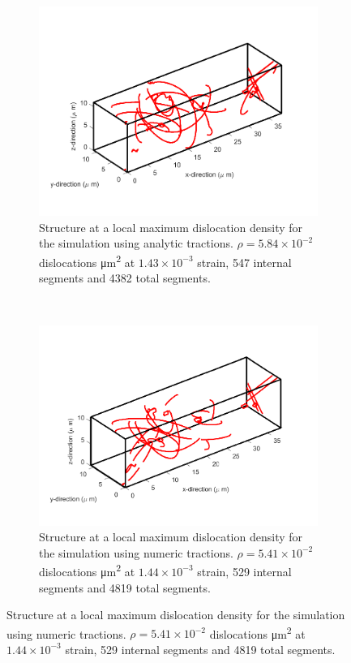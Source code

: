 \begin{figure}
    \centering
    \begin{subfigure}[t]{0.45\linewidth}
        \centering
        \includegraphics[width=\linewidth]{../data/maxDens_nSeg_547_nSegTot_4382_11-Mar-2021_8_tensile_ni_100.pdf}
        \caption[Structure at a local maximum dislocation density for the simulation using analytic tractions.]{Structure at a local maximum dislocation density for the simulation using analytic tractions. $\rho = 5.84 \times 10^{-2}$ dislocations \si{\micro\metre^{2}} at $ 1.43\times 10^{-3}$ strain, 547 internal segments and 4382 total segments.}
        \label{sf:maxDensAna}
    \end{subfigure}
    ~
    \begin{subfigure}[t]{0.45\linewidth}
        \centering
        \includegraphics[width=\linewidth]{../data/maxDens_nSeg_529_nSegTot_4819_11-Mar-2021_numT_8_tensile_ni_100.pdf}
        \caption[Structure at a local maximum dislocation density for the simulation using analytic tractions.]{Structure at a local maximum dislocation density for the simulation using numeric tractions. $\rho = 5.41\times 10^{-2}$ dislocations \si{\micro\metre^{2}} at $1.44 \times 10^{-3}$ strain, 529 internal segments and 4819 total segments.}
        \label{sf:maxDensNum}
    \end{subfigure}


\end{figure}
